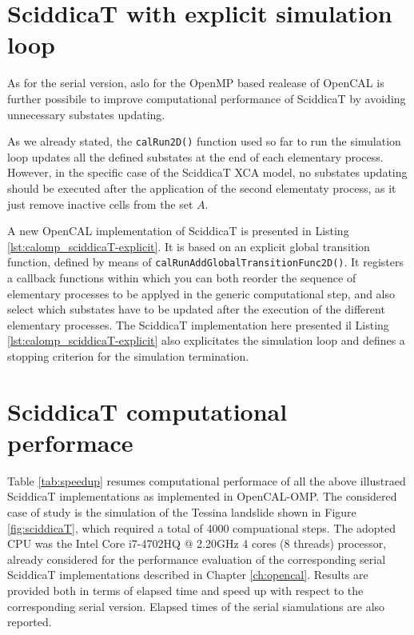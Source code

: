 \section{SciddicaT with explicit simulation loop}

As for the serial version, aslo for the OpenMP based realease of OpenCAL is
further possibile to improve computational performance of SciddicaT by
avoiding unnecessary substates updating.

As we already stated, the \verb'calRun2D()' function used so far to
run the simulation loop updates all the defined substates at the end
of each elementary process. However, in the specific case of the
SciddicaT XCA model, no substates updating should be executed after
the application of the second elementaty process, as it just remove
inactive cells from the set $A$.

A new OpenCAL implementation of SciddicaT is presented in Listing
\ref{lst:calomp_sciddicaT-explicit}. It is based on an explicit global
transition function, defined by means of
\verb'calRunAddGlobalTransitionFunc2D()'. It registers a callback
functions within which you can both reorder the sequence of elementary
processes to be applyed in the generic computational step, and also
select which substates have to be updated after the execution of the
different elementary processes. The SciddicaT implementation here
presented il Listing \ref{lst:calomp_sciddicaT-explicit} also
explicitates the simulation loop and defines a stopping criterion for
the simulation termination.




\section{SciddicaT computational performace}

Table \ref{tab:speedup} resumes computational performace of all the
above illustraed SciddicaT implementations as implemented in
OpenCAL-OMP. The considered case of study is the simulation of the
Tessina landslide shown in Figure \ref{fig:sciddicaT}, which required
a total of 4000 compuational steps. The adopted CPU was the Intel Core
i7-4702HQ @ 2.20GHz 4 cores (8 threads) processor, already considered
for the performance evaluation of the corresponding serial SciddicaT
implementations described in Chapter \ref{ch:opencal}. Results are
provided both in terms of elapsed time and speed up with respect to
the corresponding serial version. Elapsed times of the serial
siamulations are also reported.

